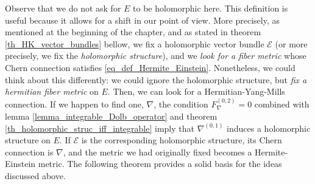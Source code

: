 Observe that we do not ask for \(E\) to be holomorphic here. This definition is useful because it allows for a shift in our point of view. More precisely, as mentioned at the beginning of the chapter, and as stated in theorem \ref{th_HK_vector_bundles} bellow, we fix a holomorphic vector bundle \(\mathcal{E}\) (or more precisely, we fix the \textit{holomorphic structure}), and we \textit{look for a fiber metric} whose Chern connection satisfies \eqref{eq_def_Hermite_Einstein}. Nonetheless, we could think about this differently: we could ignore the holomorphic structure, but \textit{fix a hermitian fiber metric} on \(E\). Then, we can look for a Hermitian-Yang-Mills connection. If we happen to find one, \(\nabla\), the condition \(F_\nabla^{(0,2)}=0\) combined with lemma \ref{lemma_integrable_Dolb_operator} and theorem \ref{th_holomorphic_struc_iff_integrable} imply that \(\nabla^{(0,1)}\) induces a holomorphic structure on \(E\). If \(\mathcal{E}\) is the corresponding holomorphic structure, its Chern connection is \(\nabla\), and the metric we had originally fixed becomes a Hermite-Einstein metric. The following theorem provides a solid basis for the ideas discussed above.

